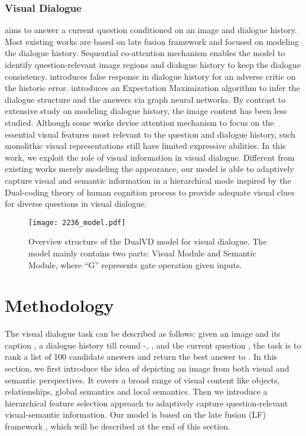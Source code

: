 \documentclass[letterpaper]{article} \usepackage{aaai20}  \usepackage{times}  \usepackage{helvet} \usepackage{courier}  \usepackage[hyphens]{url}  \usepackage{graphicx} \urlstyle{rm} \def\UrlFont{\rm}  \usepackage{graphicx}  \frenchspacing  \setlength{\pdfpagewidth}{8.5in}  \setlength{\pdfpageheight}{11in}  \usepackage{mathrsfs} \usepackage{amsfonts,amssymb}  \usepackage{tabularx} \usepackage{url}
\begin{document}
\subsubsection{Visual Dialogue} aims to answer a current question conditioned on an image and dialogue history. 
Most existing works are based on late fusion framework and focused on modeling the dialogue history. Sequential co-attention mechanism \cite{wu2018areyou} enables the model to identify question-relevant image regions and dialogue history to keep the dialogue consistency. \cite{yang2019making} introduces false response in dialogue history for an adverse critic on the historic error.  \cite{Zheng2019Reasoning} introduces an Expectation Maximization algorithm to infer the dialogue structure and the answers via graph neural networks. 
By contrast to extensive study on modeling dialogue history, the image content has been less studied. Although some works devise attention mechanism to focus on the essential visual features most relevant to the question and dialogue history, such monolithic visual representations still have limited expressive abilities. In this work, we exploit the role of visual information in visual dialogue. Different from existing works merely modeling the  appearance, our model is able to adaptively capture visual and semantic information in a hierarchical mode inspired by the Dual-coding theory of human cognition process to provide adequate visual clues for diverse questions in visual dialogue.











\begin{figure*}[t]
\centering
\texttt{[image: 2236\_model.pdf]}
\caption{Overview structure of the DualVD model for visual dialogue. The model mainly contains two parts: Visual Module and Semantic Module, where ``G'' represents gate operation given inputs.}
\label{model_pic}
\end{figure*}

\section{Methodology}
The visual dialogue task can be described as follows: given an image  and its caption , a dialogue history till round -, , and the current question , 
the task is to rank a list of 100 candidate answers  and return the best answer  to . In this section, we first introduce the idea of  depicting an image from both visual and semantic perspectives. It covers a broad range of visual content like objects, relationships, global semantics and local semantics. Then we introduce a hierarchical feature selection approach to adaptively capture question-relevant visual-semantic information. Our model is based on the late fusion (LF) framework \cite{Das2017Visual}, which will be described at the end of this section. 
\end{document}
